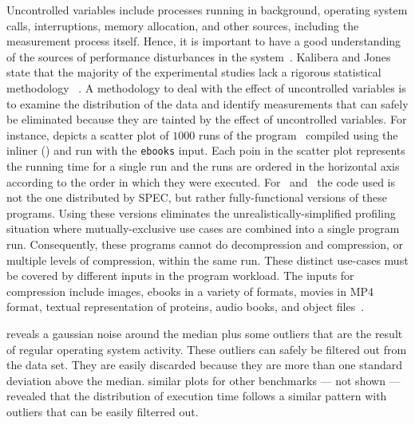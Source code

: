 Uncontrolled variables include processes running in background, operating system calls, interruptions, memory allocation, and other sources, including the measurement process itself. Hence, it is important to have a good understanding of the sources of performance disturbances in  the system~\cite{Kalibera2013}.
Kalibera and Jones state that the majority of the experimental studies lack a rigorous statistical methodology~ \cite{Kalibera2013}. A methodology to deal with the effect of uncontrolled variables is to examine the distribution of the data and identify measurements that can safely be eliminated because they are tainted by the effect of uncontrolled variables. For instance,  depicts a scatter plot of $1000$ runs of the program \bzip\  compiled using the  inliner (\llvm) and run with the {\tt ebooks} input. Each poin in the scatter plot represents the running time for a single run and the runs are ordered in the horizontal axis according to the order in which they were executed. For \bzip\ and \gzip\ the code used is not the one distributed by SPEC, but rather fully-functional versions of these programs. Using these versions eliminates the unrealistically-simplified profiling situation where mutually-exclusive use cases are combined into a single program run. Consequently, these programs cannot do decompression and compression, or multiple levels of compression, within the same run.  These distinct use-cases must be covered by different inputs in the program workload.
The inputs for compression include images, ebooks in a variety of formats, movies in MP4 format, textual representation of proteins, audio books, and object files~\cite{BerubePhD}.

 reveals a gaussian noise around the median plus some outliers that are the result of regular operating system activity. These outliers can safely be filtered out from the data set. They are easily discarded because they are more than one standard deviation above the median. similar plots for other benchmarks --- not shown --- revealed that the distribution of execution time follows a similar pattern with outliers that can be easily filterred out.

